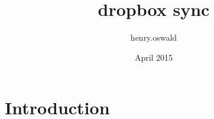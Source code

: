 \documentclass{article}
\title{dropbox sync}
\author{henry.oswald }
\date{April 2015}
\begin{document}
\maketitle

\section{Introduction}
\end{document}

